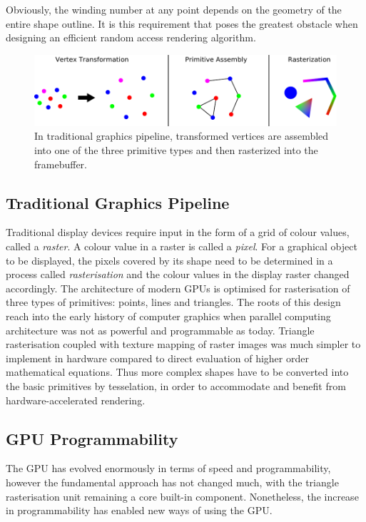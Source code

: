 \documentclass[11pt,a4paper,twoside]{article}
\begin{document}
Obviously, the winding number at any point depends on the geometry of the entire shape outline. It is this requirement that poses the greatest obstacle when designing an efficient random access rendering algorithm.

\begin {figure}
	\centering
	\includegraphics [width=1.0\columnwidth]{figures/gfx_pipeline}
	\caption {In traditional graphics pipeline, transformed vertices are assembled into one of the three primitive types and then rasterized into the framebuffer.}
	\label {fig:gfx_pipeline}
\end {figure}

\subsection{Traditional Graphics Pipeline}

Traditional display devices require input in the form of a grid of colour values, called a \emph{raster}. A colour value in a raster is called a \emph{pixel}. For a graphical object to be displayed, the pixels covered by its shape need to be determined in a process called \emph{rasterisation} and the colour values in the display raster changed accordingly. The architecture of modern GPUs is optimised for rasterisation of three types of primitives: points, lines and triangles. The roots of this design reach into the early history of computer graphics when parallel computing architecture was not as powerful and programmable as today. Triangle rasterisation coupled with texture mapping of raster images was much simpler to implement in hardware compared to direct evaluation of higher order mathematical equations. Thus more complex shapes have to be converted into the basic primitives by tesselation, in order to accommodate and benefit from hardware-accelerated rendering.

\subsection{GPU Programmability}
The GPU has evolved enormously in terms of speed and programmability, however the fundamental approach has not changed much, with the triangle rasterisation unit remaining a core built-in component. Nonetheless, the increase in programmability has enabled new ways of using the GPU.
\end{document}
